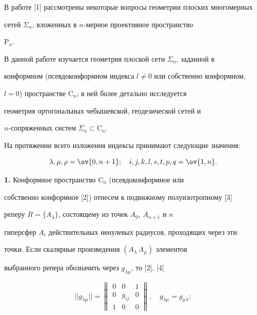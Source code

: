  


 


 


В работе [1] рассмотрены некоторые вопросы геометрии плоских многомерных 


сетей $\Sigma_n$, вложенных в $n$-мерное проективное пространство 


$\mathrm P_n$. 


 


В данной работе изучается геометрия плоской сети $\Sigma_n$, заданной в 


конформном (псевдоконформном индекса $l\ne0$ или собственно конформном, 


$l=0$) пространстве $\mathrm C_n$; в ней более детально исследуется 


геометрия ортогональных чебышевской, геодезической сетей и 


$n$-сопряженных систем $\Sigma_n\subset\mathrm C_n$. 


 


На протяжении всего изложения индексы принимают следующие значения: 


$$ 


\lambda,\mu,\rho=\ov{0,n+1};\quad i,j,k,l,s,t,p,q=\ov{1,n}. 


$$ 


 


{\bf 1.} Конформное пространство $\mathrm C_n$ (псевдоконформное или 


собственно конформное [2]) отнесем к подвижному полуизотропному [3] 


реперу $R=\{A_\lambda\}$, состоящему из точек $A_0$, $A_{n+1}$ и $n$ 


гиперсфер $A_i$ действительных ненулевых радиусов, проходящих через эти 


точки. Если скалярные произведения $(A_\lambda\,A_\mu)$ элементов 


выбранного репера обозначить через $g_{\lambda\mu}$, то [2], [4] 


\begin{equation} 


||g_{\lambda\mu}||= 


\begin{Vmatrix} 


0 & 0 & 1 \\ 0 & g_{ij} & 0 \\ 1 & 0 & 0 


\end{Vmatrix} 


,\quad g_{\lambda\mu}=g_{\mu\lambda}; 


\end{equation} 


